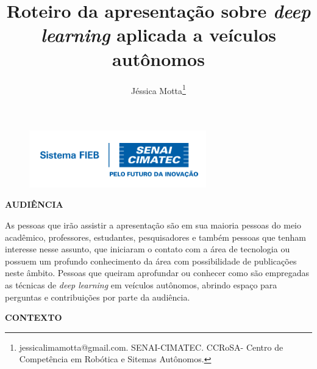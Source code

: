 \documentclass[12pt,a4paper]{article}
\begin{document}
 
\begin{figure}
    \flushright
    \includegraphics[scale=0.5]{Logo_senai.png}
\end{figure}

\title{Roteiro da apresentação sobre \textit{deep learning} aplicada a veículos autônomos}
\author{Jéssica Motta\thanks{jessicalimamotta@gmail.com. SENAI-CIMATEC. CCRoSA- Centro de Competência em Robótica e Sitemas Autônomos.}}
 
 

    \maketitle
    \singlespacing


    \textbf{AUDIÊNCIA}

    \par As pessoas que irão assistir a apresentação são em sua maioria pessoas do meio acadêmico, professores, estudantes, pesquisadores e também pessoas que tenham interesse nesse assunto, que iniciaram o contato com a área de tecnologia ou possuem um profundo conhecimento da área com possibilidade de publicações neste âmbito. Pessoas que queiram aprofundar ou conhecer como são empregadas as técnicas de \textit{deep learning} em veículos autônomos, abrindo espaço para perguntas e contribuições por parte da audiência.


    \textbf{CONTEXTO}
\end{document}
